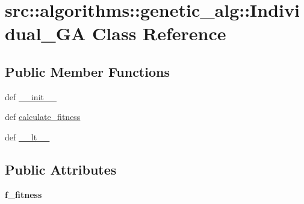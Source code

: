 \hypertarget{classsrc_1_1algorithms_1_1genetic__alg_1_1Individual__GA}{
\section{src::algorithms::genetic\_\-alg::Individual\_\-GA Class Reference}
\label{classsrc_1_1algorithms_1_1genetic__alg_1_1Individual__GA}
}
\subsection*{Public Member Functions}
\begin{DoxyCompactItemize}
\item 
def \hyperlink{classsrc_1_1algorithms_1_1genetic__alg_1_1Individual__GA_ad0e74bc5cbb450972ebbeeb4308afc67}{\_\-\_\-init\_\-\_\-}
\item 
def \hyperlink{classsrc_1_1algorithms_1_1genetic__alg_1_1Individual__GA_a38ee2a71950306a1a94d0b7c3a880e1e}{calculate\_\-fitness}
\item 
def \hyperlink{classsrc_1_1algorithms_1_1genetic__alg_1_1Individual__GA_a85219abf3df3e28e7577c945bd045e89}{\_\-\_\-lt\_\-\_\-}
\end{DoxyCompactItemize}
\subsection*{Public Attributes}
\begin{DoxyCompactItemize}
\item 
\hypertarget{classsrc_1_1algorithms_1_1genetic__alg_1_1Individual__GA_ababdfe6ef039e17e42e6f9bf406863a1}{
{\bfseries f\_\-fitness}}
\label{classsrc_1_1algorithms_1_1genetic__alg_1_1Individual__GA_ababdfe6ef039e17e42e6f9bf406863a1}

\end{DoxyCompactItemize}


